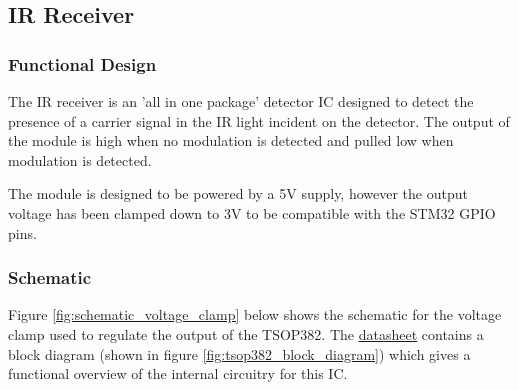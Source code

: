 



\subsection{IR Receiver}

\subsubsection{Functional Design}
The IR receiver is an 'all in one package' detector IC designed to detect the presence of a carrier signal in the IR light incident on the detector. The output of the module is high when no modulation is detected and pulled low when modulation is detected.

The module is designed to be powered by a 5V supply, however the output voltage has been clamped down to 3V to be compatible with the STM32 GPIO pins.

\subsubsection{Schematic}
Figure \ref{fig:schematic_voltage_clamp} below shows the schematic for the voltage clamp used to regulate the output of the TSOP382. The \href{https://www.vishay.com/docs/82491/tsop382.pdf}{datasheet} contains a block diagram (shown in figure \ref{fig:tsop382_block_diagram}) which gives a functional overview of the internal circuitry for this IC.


